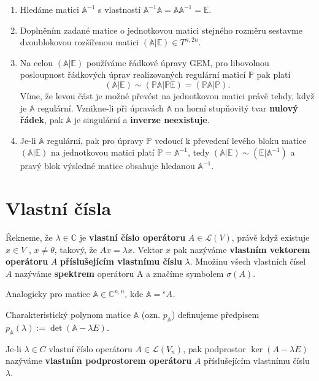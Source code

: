 \documentclass{szzclass}
\newcommand*{\trans}[3]{{}^{#1}#2^{#3}}
\begin{document}
\begin{enumerate}
\item Hledáme matici $\mathbb{A}^{-1}$ s vlastností $\mathbb{A}^{-1}\mathbb{A} = \mathbb{A}\mathbb{A}^{-1} = \mathbb{E}$.
\item Doplněním zadané matice o jednotkovou matici stejného rozměru sestavme dvoublokovou rozšířenou matici $(\mathbb{A} | \mathbb{E}) \in T^{n,2n}$.
\item Na celou $(\mathbb{A} | \mathbb{E})$ používáme řádkové úpravy GEM, pro libovolnou posloupnost řádkových úprav realizovaných regulární maticí $\mathbb{P}$ pak platí
\[
  (\mathbb{A} | \mathbb{E}) \sim (\mathbb{P}\mathbb{A} | \mathbb{P}\mathbb{E}) = (\mathbb{P}\mathbb{A} | \mathbb{P}).
\]
Víme, že levou část je možné převést na jednotkovou matici právě tehdy, když je $\mathbb{A}$ regulární. Vznikne-li při úpravách $\mathbb{A}$ na horní stupňovitý tvar \textbf{nulový řádek}, pak $\mathbb{A}$ je singulární a \textbf{inverze neexistuje}.
\item Je-li $\mathbb{A}$ regulární, pak pro úpravy $\mathbb{P}$ vedoucí k převedení levého bloku matice $(\mathbb{A} | \mathbb{E})$ na jednotkovou matici platí $\mathbb{P} = \mathbb{A}^{-1}$, tedy $(\mathbb{A} | \mathbb{E}) \sim (\mathbb{E} | \mathbb{A}^{-1})$ a pravý blok výsledné matice obsahuje hledanou $\mathbb{A}^{-1}$.
\end{enumerate}

\section{Vlastní čísla}
\begin{definition}  
Řekneme, že $\lambda \in \mathbb{C}$ je \textbf{vlastní číslo operátoru} $A \in \mathcal{L}(V)$, právě když existuje $x \in V$ , $x \neq \theta$, takový, že $Ax = \lambda x$. Vektor $x$ pak nazýváme \textbf{vlastním vektorem operátoru} $A$ \textbf{příslušejícím vlastnímu číslu} $\lambda$. Množinu všech vlastních čísel $A$ nazýváme \textbf{spektrem} operátoru A a značíme symbolem $\sigma(A)$.

Analogicky pro matice $\mathbb{A}\in \mathbb{C}^{n,n}$, kde $\mathbb{A}=\trans{\varepsilon}{A}{}$.

Charakteristický polynom matice $\mathbb{A}$ (ozn. $p_\mathbb{A}$) definujeme předpisem $p_\mathbb{A}(\lambda) := \det(\mathbb{A} - \lambda E)$.
\end{definition}

\begin{definition}
Je-li $\lambda \in C$ vlastní číslo operátoru $A \in \mathcal{L}(V_n)$, pak podprostor $\ker{(A-
\lambda E)}$ nazýváme \textbf{vlastním podprostorem operátoru} $A$ příslušejícím vlastnímu
číslu $\lambda$.
\end{definition}
\end{document}
